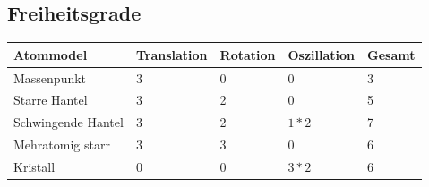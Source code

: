 \subsection{Freiheitsgrade}				%
\begin{table}[h!]
	
	\begin{tabular}{|m{3cm}|m{3cm}|m{3cm}|m{3cm}|m{3cm}|}
		\hline 
	\textbf{Atommodel}	& \textbf{Translation} & \textbf{Rotation}  & \textbf{Oszillation} & \textbf{Gesamt}    \\ 
		\hline 
		Massenpunkt & 3 & 0 & 0 & 3   \\ 
		\hline 
		Starre Hantel& 3 & 2 & 0 & 5   \\ 
		\hline 
		Schwingende Hantel& 3 & 2 & $1*2$ & 7   \\ 
		\hline 
		Mehratomig starr& 3 & 3 & 0 & 6    \\ 
		\hline 
		Kristall& 0 & 0 & $3*2$ & 6    \\ 
		\hline 
	\end{tabular} 
\end{table}




